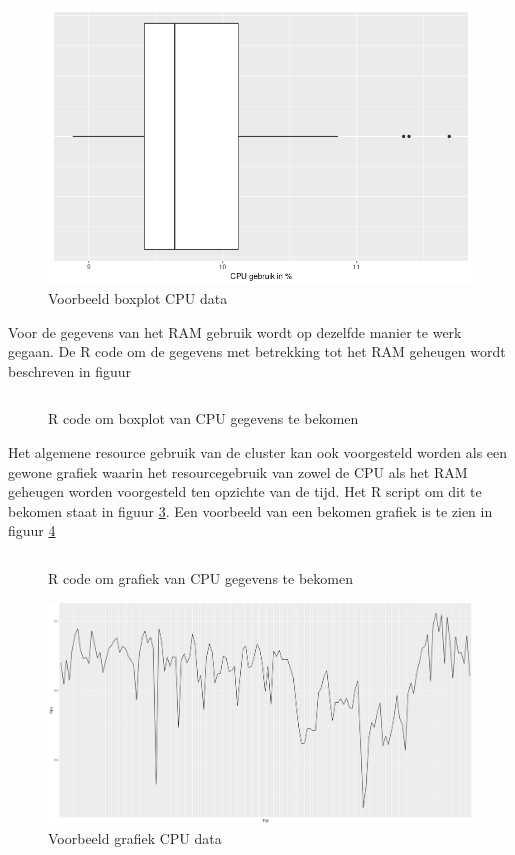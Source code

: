 \begin{figure}[h]
	\centering
	\includegraphics[width=\linewidth]{img/CPUBoxEx.png}
	\caption{Voorbeeld boxplot CPU data}
	\label{fig:CPUBoxEx}
\end{figure}

Voor de gegevens van het RAM gebruik wordt op dezelfde manier te werk gegaan. De R code om de gegevens met betrekking tot het RAM geheugen wordt beschreven in figuur 
\begin{figure}[h] 
	\inputminted[fontsize=\footnotesize,linenos]{R}{files/dataRAMBox.R}
	\caption{R code om boxplot van CPU gegevens te bekomen}
	\label{CPUBox}
\end{figure}


Het algemene resource gebruik van de cluster kan ook voorgesteld worden als een gewone grafiek waarin het resourcegebruik van zowel de CPU als het RAM geheugen worden voorgesteld ten opzichte van de tijd. Het R script om dit te bekomen staat in figuur \ref{CPUGraph}. Een voorbeeld van een bekomen grafiek is te zien in figuur \ref{fig:CPUgraphEx}
\begin{figure}[h] 
	\inputminted[fontsize=\footnotesize,linenos]{R}{files/dataCpuGraph.R}
	\caption{R code om grafiek van CPU gegevens te bekomen}
	\label{CPUGraph}
\end{figure}

\begin{figure}[h]
	\centering
	\includegraphics[width=\linewidth]{img/CPUGraphEx.png}
	\caption{Voorbeeld grafiek CPU data}
	\label{fig:CPUgraphEx}
\end{figure}


